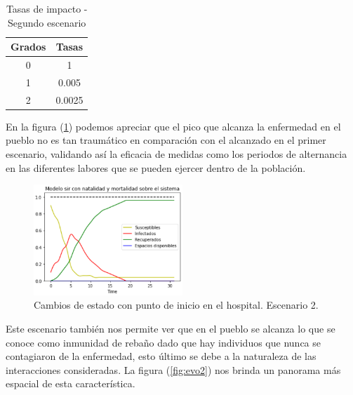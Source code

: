 \begin{table}[h]
\begin{center}
\begin{tabular}{| c | c |}
\hline
Grados & Tasas \\ \hline
0 & 1 \\
1 & 0.005 \\
2 & 0.0025 \\\hline
\end{tabular}
\caption{Tasas de impacto - Segundo escenario}
\label{tab:tasasDeImpacto2}
\end{center}
\end{table}

En la figura (\ref{fig:metricas2}) podemos apreciar que el pico que alcanza la enfermedad en el pueblo no es tan traumático en comparación con el alcanzado en el primer escenario, validando así la eficacia de medidas como los periodos de alternancia en las diferentes labores que se pueden ejercer dentro de la población.

\newpage

\begin{figure}[h]
  \centering
    \includegraphics[width=0.5\textwidth]{Imagenes/metricas2.PNG}
    \caption{Cambios de estado con punto de inicio en el hospital. Escenario 2.}
    \label{fig:metricas2}
\end{figure}

Este escenario también nos permite ver que en el pueblo se alcanza lo que se conoce como inmunidad de rebaño dado que hay individuos que nunca se contagiaron de la enfermedad, esto último se debe a la naturaleza de las interacciones consideradas. La figura (\ref{fig:evo2}) nos brinda un panorama más espacial de esta característica.

